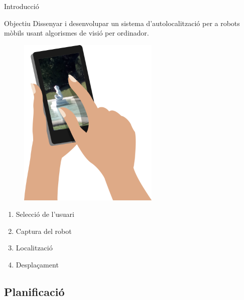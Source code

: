 \documentclass[xcolor=table, 11pt]{beamer}
\newcommand\tz{\fontsize{13}{15.6}\selectfont}
\begin{document}
	\begin{frame}{Introducció}
		\tz
		\begin{block}{Objectiu}
			Dissenyar i desenvolupar un sistema d'autolocalització per a robots mòbils usant algorismes de visió per ordinador.
		\end{block}
		\vspace{1em}
		\begin{minipage}{0.49\textwidth}
			\begin{figure}
				\includegraphics[width=0.6\textwidth]{images/smartjardi}
			\end{figure}
		\end{minipage}
		\hfill
		\begin{minipage}{0.49\textwidth}
			\begin{enumerate}
				\item Selecció de l'usuari
				\item Captura del robot
				\item Localització
				\item Desplaçament
			\end{enumerate}
		\end{minipage}
	\end{frame}

	\begin{frame}[plain]
		\section{Planificació}
	\end{frame}
\end{document}
